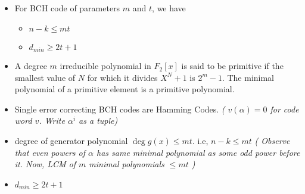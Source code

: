 \documentclass[a4paper]{article}
\theoremstyle{dotless}
\theoremstyle{dotless}
\theoremstyle{remark}
\begin{document}
\begin{itemize}
\item For BCH code of parameters $m$ and $t$, we have
	\begin{itemize}
	\item $n-k\leq mt$
	\item $d_{min} \geq 2t+1$
	\end{itemize}

\item A degree $m$ irreducible polynomial in $F_2[x]$ is said to be primitive if the smallest value of $N$ for which it divides $X^N+1$ is $2^m-1$. The minimal polynomial of a primitive element is a primitive polynomial. 

\item Single error correcting BCH codes are Hamming Codes. \textsl{ ( $v(\alpha) = 0$ for code word $v$. Write $\alpha^i$ as a tuple)}

\item degree of generator polynomial $\deg{g(x)} \leq mt$. i.e, $n-k\leq mt$
\textsl{ ( Observe that even powers of $\alpha$ has same minimal polynomial as some odd power before it. Now, LCM of $m$ minimal polynomials $\leq mt$ )}

\item $d_{min} \geq 2t+1$ 
\end{itemize}
\end{document}
